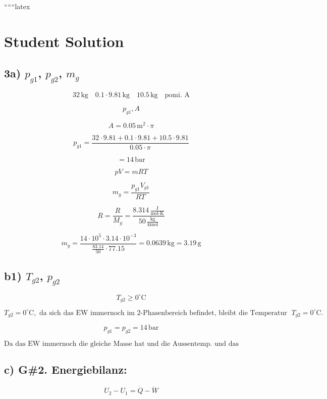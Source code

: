 
``````latex


\section*{Student Solution}

\subsection*{3a) $p_{g1}$, $p_{g2}$, $m_g$}

\[
32 \, \text{kg} \quad 0.1 \cdot 9.81 \, \text{kg} \quad \text{10.5} \, \text{kg} \quad \text{pomi. A}
\]

\[
p_{g1}, A
\]

\[
A = 0.05 \, \text{m}^2 \cdot \pi
\]

\[
p_{g1} = \frac{32 \cdot 9.81 + 0.1 \cdot 9.81 + 10.5 \cdot 9.81}{0.05 \cdot \pi}
\]

\[
= 14 \, \text{bar}
\]

\[
pV = mRT
\]

\[
m_g = \frac{p_{g1} V_{g1}}{RT}
\]

\[
R = \frac{R}{M_g} = \frac{8.314 \, \frac{\text{J}}{\text{mol} \cdot \text{K}}}{50 \, \frac{\text{kg}}{\text{kmol}}}
\]

\[
m_g = \frac{14 \cdot 10^5 \cdot 3.14 \cdot 10^{-3}}{\frac{83.14}{50} \cdot 77.15} = 0.0639 \, \text{kg} = 3.19 \, \text{g}
\]

\subsection*{b1) $T_{g2}$, $p_{g2}$}

\[
T_{g2} \geq 0^\circ \text{C}
\]

\[
T_{g2} = 0^\circ \text{C}, \text{ da sich das EW immernoch im 2-Phasenbereich befindet, bleibt die Temperatur gleich und da das ganze System im GGW ist, ist auch } T_{g2} = 0^\circ \text{C}.
\]

\[
p_{g1} = p_{g2} = 14 \, \text{bar}
\]

\[
\text{Da das EW immernoch die gleiche Masse hat und die Aussentemp. und das Gewicht des Kolbens gleich bleiben, bleibt auch der Druck im GGW gleich.}
\]

\subsection*{c) G\#2. Energiebilanz:}

\[
U_2 - U_1 = \dot{Q} - \dot{W}
\]

